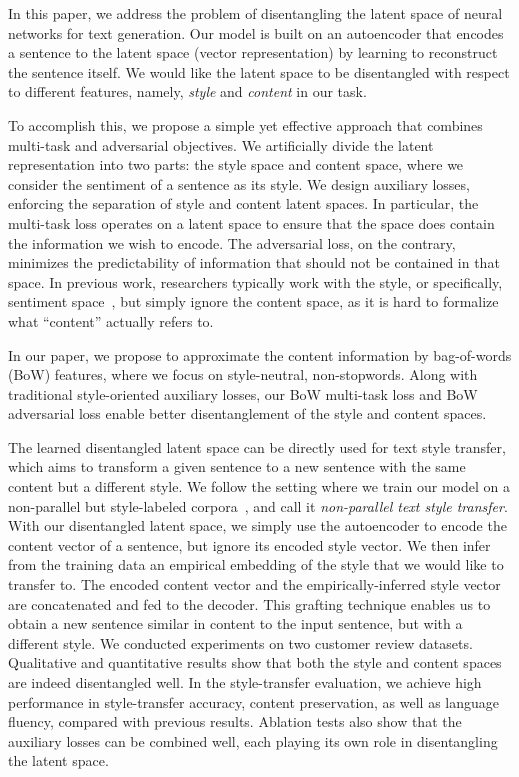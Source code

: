 \documentclass[11pt,a4paper]{article}
\begin{document}
In this paper, we address the problem of disentangling the latent space of neural networks for text generation.
Our model is built on an autoencoder that encodes a sentence to the latent space (vector representation) by learning to reconstruct the sentence itself.
We would like the latent space to be disentangled with respect to different features, namely, \textit{style} and \textit{content} in our task.

To accomplish this, we propose a simple yet effective approach that combines multi-task and adversarial objectives.
We artificially divide the latent representation into two parts: the style space and content space, where we consider the sentiment of a sentence as its style.
We design auxiliary losses, enforcing the separation of style and content latent spaces.
In particular, the multi-task loss operates on a latent space to ensure that the space does contain the information we wish to encode.
The adversarial loss, on the contrary, minimizes the predictability of information that should not be contained in that space.
In previous work, researchers typically work with the style, or specifically, sentiment space~\cite{hu2017toward,shen2017style,fu2018style}, but simply ignore the content space, as it is hard to formalize what ``content'' actually refers to.

In our paper, we propose to approximate the content information by bag-of-words (BoW) features, where we focus on style-neutral, non-stopwords.
Along with traditional style-oriented auxiliary losses, our BoW multi-task loss and BoW adversarial loss enable better disentanglement of the style and content spaces.

The learned disentangled latent space can be directly used for text style transfer, which aims to transform a given sentence to a new sentence with the same content but a different style.
We follow the setting where we train our model on a non-parallel but style-labeled corpora~\cite{hu2017toward,shen2017style}, and call it \textit{non-parallel text style transfer}.
With our disentangled latent space, we simply use the autoencoder to encode the content vector of a sentence, but ignore its encoded style vector.
We then infer from the training data an empirical embedding of the style that we would like to transfer to.
The encoded content vector and the empirically-inferred style vector are concatenated and fed to the decoder.
This grafting technique enables us to obtain a new sentence similar in content to the input sentence, but with a different style.
We conducted experiments on two customer review datasets.
Qualitative and quantitative results show that both the style and content spaces are indeed disentangled well.
In the style-transfer evaluation, we achieve high performance in style-transfer accuracy, content preservation, as well as language fluency, compared with previous results.
Ablation tests also show that the auxiliary losses can be combined well, each playing its own role in disentangling the latent space.
\end{document}
